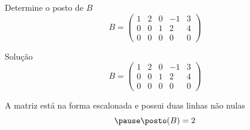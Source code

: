 \begin{question}
  Determine o posto de $B$
  \[
    B =
    \begin{pmatrix}
      1 & 2 & 0 & -1 & 3 \\
      0 & 0 & 1 & 2  & 4 \\
      0 & 0 & 0 & 0  & 0
    \end{pmatrix}
  \]
\end{question}

\begin{resolution}{Solução}
  \[
    B =
    \begin{pmatrix}
      1 & 2 & 0 & -1 & 3 \\
      0 & 0 & 1 & 2  & 4 \\
      0 & 0 & 0 & 0  & 0
    \end{pmatrix}
  \]

  \pause
  A matriz está na forma escalonada
  \pause
  e possui duas linhas não nulas
  \[
    \pause
    \posto(B) = 2
  \]

\end{resolution}

\endinput
